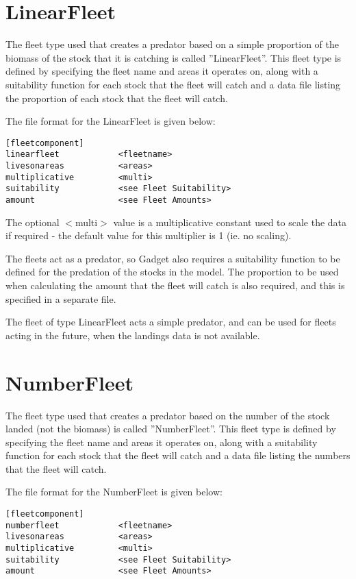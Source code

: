 \documentclass[10pt,twoside]{book}
\begin{document}
\section{LinearFleet}\label{sec:linearfleet}
The fleet type used that creates a predator based on a simple proportion of the biomass of the stock that it is catching is called ''LinearFleet''.  This fleet type is defined by specifying the fleet name and areas it operates on, along with a suitability function for each stock that the fleet will catch and a data file listing the proportion of each stock that the fleet will catch.

\bigskip
The file format for the LinearFleet is given below:

{\small\begin{verbatim}
[fleetcomponent]
linearfleet            <fleetname>
livesonareas           <areas>
multiplicative         <multi>
suitability            <see Fleet Suitability>
amount                 <see Fleet Amounts>
\end{verbatim}}

The optional $<$multi$>$ value is a multiplicative constant used to scale the data if required - the default value for this multiplier is 1 (ie. no scaling).

\bigskip
The fleets act as a predator, so Gadget also requires a suitability function to be defined for the predation of the stocks in the model.  The proportion to be used when calculating the amount that the fleet will catch is also required, and this is specified in a separate file.

\bigskip
The fleet of type LinearFleet acts a simple predator, and can be used for fleets acting in the future, when the landings data is not available.

\section{NumberFleet}\label{sec:numberfleet}
The fleet type used that creates a predator based on the number of the stock landed (not the biomass) is called ''NumberFleet''.  This fleet type is defined by specifying the fleet name and areas it operates on, along with a suitability function for each stock that the fleet will catch and a data file listing the numbers that the fleet will catch.

\bigskip
The file format for the NumberFleet is given below:

{\small\begin{verbatim}
[fleetcomponent]
numberfleet            <fleetname>
livesonareas           <areas>
multiplicative         <multi>
suitability            <see Fleet Suitability>
amount                 <see Fleet Amounts>
\end{verbatim}}
\end{document}
